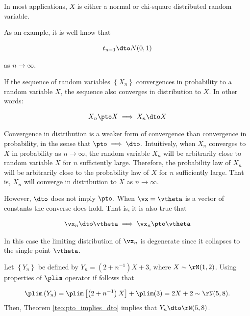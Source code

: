 \begin{remark}
In most applications, $X$ is either a normal or chi-square distributed random variable. 
\end{remark}


As an example, it is well know that 

\begin{equation*}
t_{n-1}\dto N(0, 1)
\end{equation*}

as $n\to \infty$.

\begin{theorem}\label{teo:pto_implies_dto}
  If the sequence of random variables $\left\lbrace X_n \right\rbrace$ convergences in probability to a random variable $X$, the sequence also converges in distribution to $X$. In other words:
  
  \begin{equation*}
    X_n\pto X\implies X_n\dto X
  \end{equation*}
\end{theorem}

Convergence in distribution is a weaker form of convergence than convergence in probability, in the sense that $\pto \implies \dto$. Intuitively, when $X_n$ converges to $X$ in probability as $n\to \infty$, the random variable $X_n$ will be arbitrarily close to random variable $X$ for $n$ sufficiently large. Therefore, the probability law of $X_n$ will be arbitrarily close to the probability law of $X$ for $n$ sufficiently large. That is, $X_n$ will converge in distribution to $X$ as $n\to \infty$.

However, $\dto$ does not imply $\pto$. When $\vx = \vtheta$ is a vector of constants the converse does hold. That is, it is also true that

\begin{equation*}
  \vx_n\dto \vtheta \implies \vx_n\pto \vtheta
\end{equation*}

In this case the limiting distribution of $\vx_n$ is degenerate since it collapses to the single point $\vtheta$.

\begin{example}
Let $\left\lbrace Y_n\right\rbrace$ be defined by $Y_n = \left(2 + n^{-1}\right)X + 3$, where $X\sim \rN(1, 2)$. Using properties of $\plim$ operator if follows that

\begin{equation*}
  \plim \left(Y_n\right) = \plim \left[\left(2 + n^{-1}\right)X\right] + \plim(3) = 2X + 2 \sim \rN(5, 8). 
\end{equation*}
Then, Theorem \ref{teo:pto_implies_dto} implies that $Y_n\dto \rN(5, 8)$.
\end{example}

